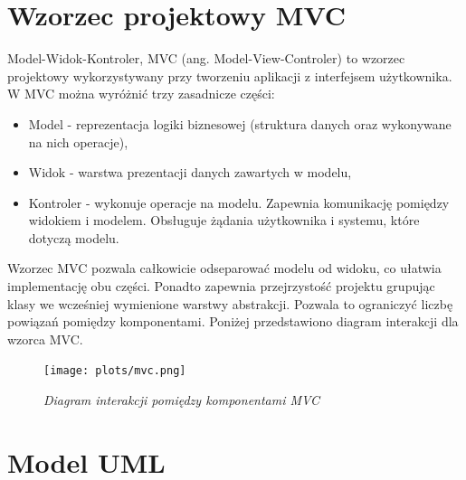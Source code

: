 \documentclass[eng,printmode]{mgr}
\begin{document}
\section{Wzorzec projektowy MVC}
Model-Widok-Kontroler, MVC (ang. Model-View-Controler) to wzorzec projektowy wykorzystywany przy tworzeniu aplikacji z interfejsem użytkownika. W MVC można wyróżnić trzy zasadnicze części:
\begin{itemize}
  \item Model - reprezentacja logiki biznesowej (struktura danych oraz wykonywane na nich operacje),
  \item Widok - warstwa prezentacji danych zawartych w modelu,
  \item Kontroler - wykonuje operacje na modelu. Zapewnia komunikację pomiędzy widokiem i modelem. Obsługuje żądania użytkownika i systemu, które dotyczą modelu.  
\end{itemize}

Wzorzec MVC pozwala całkowicie odseparować modelu od widoku, co ułatwia implementację obu części. Ponadto zapewnia przejrzystość projektu grupując klasy we wcześniej wymienione warstwy abstrakcji. Pozwala to ograniczyć liczbę powiązań pomiędzy komponentami. Poniżej przedstawiono diagram interakcji dla wzorca MVC.


\begin{center}\centering
\vspace*{\fill}
\begin{figure}[!h]
    \centering
    \texttt{[image: plots/mvc.png]}
    \caption{\textit{Diagram interakcji pomiędzy komponentami MVC}}
\end{figure}
\vfill
\end{center}

\section{Model UML}
\end{document}
